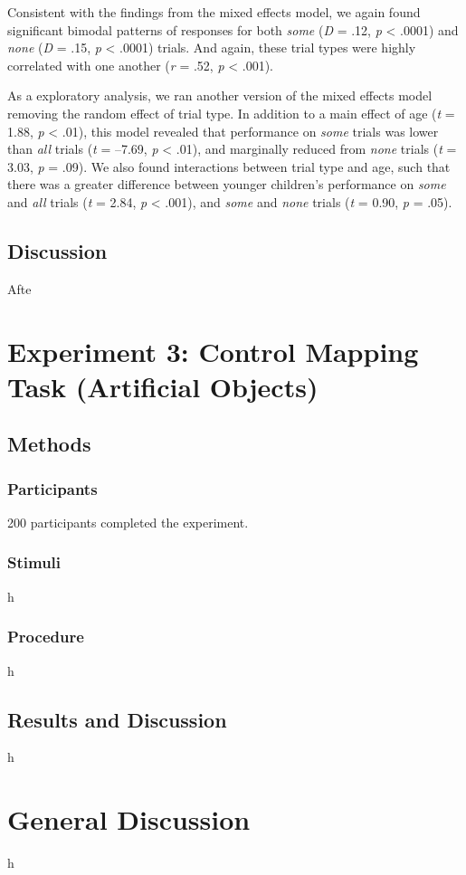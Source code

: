 \documentclass[man]{apa2}
\begin{document}
Consistent with the findings from the mixed effects model, we again found significant bimodal patterns of responses for both \textit{some} (\textit{D} = .12, \textit{p} < .0001) and \textit{none} (\textit{D} = .15, \textit{p} < .0001) trials. And again, these trial types were highly correlated with one another (\textit{r} = .52, \textit{p} < .001). 

As a exploratory analysis, we ran another version of the mixed effects model removing the random effect of trial type. In addition to a main effect of age (\textit{t} = 1.88, \textit{p} < .01), this model revealed that performance on \textit{some} trials was lower than \textit{all} trials (\textit{t} = --7.69, \textit{p} < .01), and marginally reduced from \textit{none} trials (\textit{t} = 3.03, \textit{p} = .09). We also found interactions between trial type and age, such that there was a greater difference between younger children's performance on \textit{some} and \textit{all} trials (\textit{t} = 2.84, \textit{p} < .001), and \textit{some} and \textit{none} trials (\textit{t} = 0.90, \textit{p} = .05). 

\subsection{Discussion}

Afte




				
\section{Experiment 3: Control Mapping Task (Artificial Objects)}

\subsection{Methods}
\subsubsection{Participants} 200 participants completed the experiment.
\subsubsection{Stimuli} h

\subsubsection{Procedure}
h

\subsection{Results and Discussion}
h

\section{General Discussion}

h







\newpage
\theappendix 

\section{}
\end{document}

